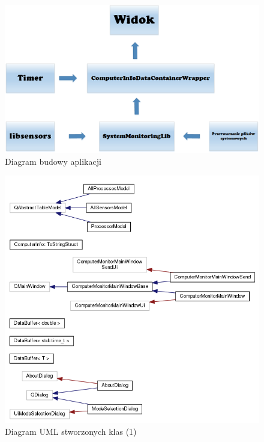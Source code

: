 \documentclass[a4paper]{article}
\begin{document}
\begin{figure}[H]
	\centering
	\includegraphics[width=\linewidth]{img/diagramBudowyAplikacji.png}
	\caption{Diagram budowy aplikacji}
	\label{diagram_budowy_aplikacji}
\end{figure}


\begin{figure}[H]
	\centering
	\includegraphics[width=\linewidth]{img/diagramKlas.png}
	\caption{Diagram UML stworzonych klas (1)}
	\label{diagram_klas}
\end{figure}
\end{document}
